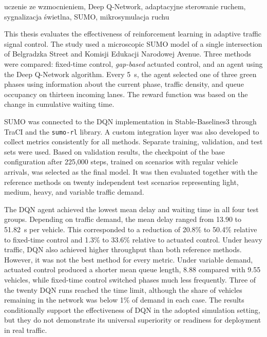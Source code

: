 \documentclass[
    bindingoffset=5mm,  %
    footnoteindent=3mm, %
    hyphenation=true    %
]{src/wut-thesis}
\begin{document}
\keywords
uczenie ze wzmocnieniem, Deep Q-Network, adaptacyjne sterowanie ruchem, sygnalizacja świetlna, SUMO, mikrosymulacja ruchu

\clearpage
\secondabstract
This thesis evaluates the effectiveness of reinforcement learning in adaptive traffic signal control. The study used a microscopic SUMO model of a single intersection of Belgradzka Street and Komisji Edukacji Narodowej Avenue. Three methods were compared: fixed-time control, \textit{gap-based} actuated control, and an agent using the Deep Q-Network algorithm. Every 5~s, the agent selected one of three green phases using information about the current phase, traffic density, and queue occupancy on thirteen incoming lanes. The reward function was based on the change in cumulative waiting time.

SUMO was connected to the DQN implementation in Stable-Baselines3 through TraCI and the \texttt{sumo-rl} library. A custom integration layer was also developed to collect metrics consistently for all methods. Separate training, validation, and test sets were used. Based on validation results, the checkpoint of the base configuration after 225,000 steps, trained on scenarios with regular vehicle arrivals, was selected as the final model. It was then evaluated together with the reference methods on twenty independent test scenarios representing light, medium, heavy, and variable traffic demand.

The DQN agent achieved the lowest mean delay and waiting time in all four test groups. Depending on traffic demand, the mean delay ranged from 13.90 to 51.82~s per vehicle. This corresponded to a reduction of 20.8\% to 50.4\% relative to fixed-time control and 1.3\% to 33.6\% relative to actuated control. Under heavy traffic, DQN also achieved higher throughput than both reference methods. However, it was not the best method for every metric. Under variable demand, actuated control produced a shorter mean queue length, 8.88 compared with 9.55 vehicles, while fixed-time control switched phases much less frequently. Three of the twenty DQN runs reached the time limit, although the share of vehicles remaining in the network was below 1\% of demand in each case. The results conditionally support the effectiveness of DQN in the adopted simulation setting, but they do not demonstrate its universal superiority or readiness for deployment in real traffic.
\end{document}
